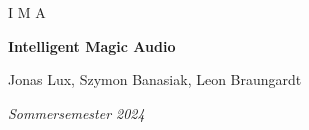 \documentclass{article}
\begin{document}
\begin{titlepage}
\centering

	{\Large I M A \par}
	{\huge\bfseries Intelligent Magic Audio\par}
	{Jonas Lux, Szymon Banasiak, Leon Braungardt\par}
	\vspace{2cm}
	{\Large\itshape Sommersemester 2024 \par}
	\vfill
	
  
\end{titlepage}


\tableofcontents
\listoffigures
\newpage










\printbibliography[title=Literaturverzeichnis]

\appendix

\newpage
\end{document}
